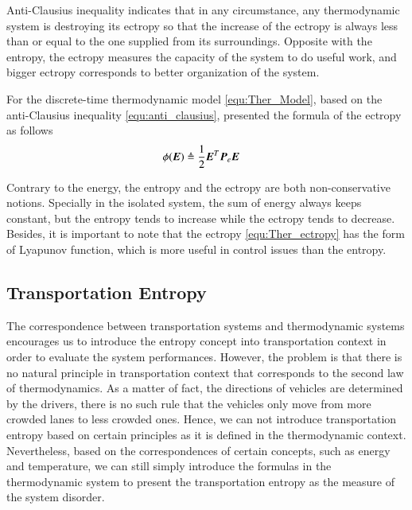 \documentclass[preprint,authoryear,12pt]{elsarticle}
\renewcommand{\vec}[1]{\mbox{\boldmath$#1$}}
\newcommand{\mat}[1]{\mbox{\boldmath$#1$}}
\begin{document}
Anti-Clausius inequality indicates that in any circumstance, any thermodynamic system is destroying its ectropy so that the increase of the ectropy is always less than or equal to the one supplied from its surroundings. Opposite with the entropy, the ectropy measures the capacity of the system to do useful work, and bigger ectropy corresponds to better organization of the system.

For the discrete-time thermodynamic model \eqref{equ:Ther_Model}, based on the anti-Clausius inequality \eqref{equ:anti_clausius}, \citet{haddad_thermodynamic_2005} presented the formula of the ectropy as follows
\begin{align}
\phi(\vec{E})&\triangleq\frac{1}{2}\vec{E}^T \mat{P}_e \vec{E}
\label{equ:Ther_ectropy}
\end{align}

Contrary to the energy, the entropy and the ectropy are both non-conservative notions. Specially in the isolated system, the sum of energy always keeps constant, but the entropy tends to increase while the ectropy tends to decrease. Besides, it is important to note that the ectropy \eqref{equ:Ther_ectropy} has the form of Lyapunov function, which is more useful in control issues than the entropy.

\subsection{Transportation Entropy}
The correspondence between transportation systems and thermodynamic systems encourages us to introduce the entropy concept into transportation context in order to evaluate the system performances. However, the problem is that there is no natural principle in transportation context that corresponds to the second law of thermodynamics. As a matter of fact, the directions of vehicles are determined by the drivers, there is no such rule that the vehicles only move from more crowded lanes to less crowded ones. Hence, we can not introduce transportation entropy based on certain principles as it is defined in the thermodynamic context. Nevertheless, based on the correspondences of certain concepts, such as energy and temperature, we can still simply introduce the formulas in the thermodynamic system to present the transportation entropy as the measure of the system disorder.
\end{document}
